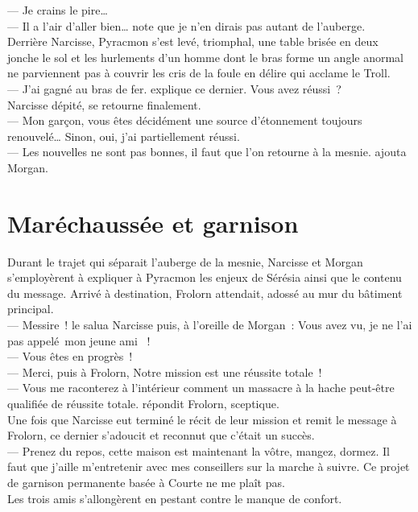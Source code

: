 \documentclass[french, a4paper, 12pt]{article}
\begin{document}
--- Je crains le pire…\\
--- Il a l'air d'aller bien… note que je n'en dirais pas autant de l'auberge.\\
Derrière Narcisse, Pyracmon s'est levé, triomphal, une table brisée en deux jonche le sol et les hurlements d'un homme dont le bras forme un angle anormal ne parviennent pas à couvrir les cris de la foule en délire qui acclame le Troll.\\
--- J'ai gagné au bras de fer. explique ce dernier. Vous avez réussi~?\\
Narcisse dépité, se retourne finalement.\\
--- Mon garçon, vous êtes décidément une source d'étonnement toujours renouvelé… Sinon, oui, j'ai partiellement réussi.\\
--- Les nouvelles ne sont pas bonnes, il faut que l'on retourne à la mesnie. ajouta Morgan.\\

\section{Maréchaussée et garnison}
Durant le trajet qui séparait l'auberge de la mesnie, Narcisse et Morgan s'employèrent à expliquer à Pyracmon les enjeux de Sérésia ainsi que le contenu du message. Arrivé à destination, Frolorn attendait, adossé au mur du bâtiment principal.\\
--- Messire~! le salua Narcisse puis, à l'oreille de Morgan~: Vous avez vu, je ne l'ai pas appelé~\og mon jeune ami \fg~!\\
--- Vous êtes en progrès~!\\
--- Merci, puis à Frolorn, Notre mission est une réussite totale~!\\
--- Vous me raconterez à l'intérieur comment un massacre à la hache peut-être qualifiée de réussite totale. répondit Frolorn, sceptique.\\
Une fois que Narcisse eut terminé le récit de leur mission et remit le message à Frolorn, ce dernier s'adoucit et reconnut que c'était un succès.\\
--- Prenez du repos, cette maison est maintenant la vôtre, mangez, dormez. Il faut que j'aille m'entretenir avec mes conseillers sur la marche à suivre. Ce projet de garnison permanente basée à Courte ne me plaît pas.\\
Les trois amis s'allongèrent en pestant contre le manque de confort.
\end{document}
